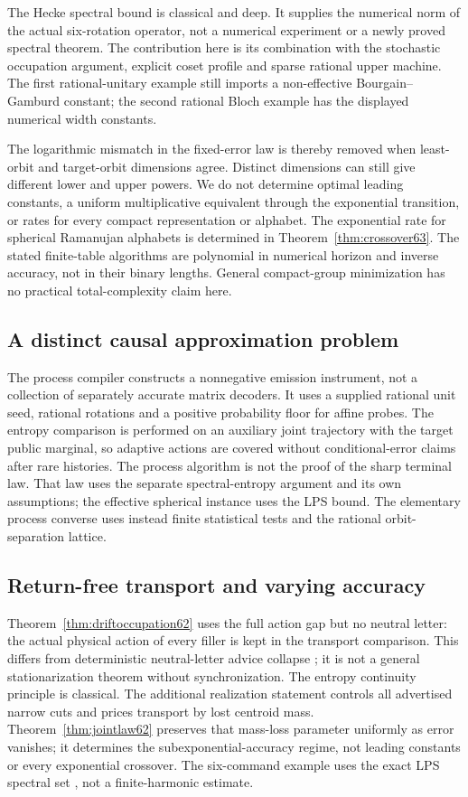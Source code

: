 The Hecke spectral bound \cite{LPS61,PLP61pre} is classical and deep.
It supplies the numerical norm of the actual six-rotation operator,
not a numerical experiment or a newly proved spectral theorem.
The contribution here is its combination with the stochastic
occupation argument, explicit coset profile and sparse rational upper
machine. The first rational-unitary example still imports a
non-effective Bourgain--Gamburd constant; the second rational Bloch
example has the displayed numerical width constants.

The logarithmic mismatch in the fixed-error law is thereby removed
when least-orbit and target-orbit dimensions agree. Distinct dimensions
can still give different lower and upper powers. We do not determine
optimal leading constants, a uniform multiplicative equivalent through
the exponential transition, or rates for every compact representation
or alphabet. The exponential rate for spherical Ramanujan alphabets
is determined in Theorem~\ref{thm:crossover63}. The stated finite-table
algorithms are polynomial in numerical horizon and inverse accuracy,
not in their binary lengths. General compact-group minimization has no
practical total-complexity claim here.

\subsection{A distinct causal approximation problem}
The process compiler constructs a nonnegative emission instrument, not
a collection of separately accurate matrix decoders. It uses a supplied
rational unit seed, rational rotations and a positive probability floor
for affine probes. The entropy comparison is performed on an auxiliary
joint trajectory with the target public marginal, so adaptive actions
are covered without conditional-error claims after rare histories.
The process algorithm is not the proof of the sharp terminal law.
That law uses the separate spectral-entropy argument and its own
assumptions; the effective spherical instance uses the LPS bound. The elementary process converse uses instead
finite statistical tests and the rational orbit-separation lattice.

\subsection{Return-free transport and varying accuracy}
Theorem~\ref{thm:driftoccupation62} uses the full action gap but no
neutral letter: the actual physical action of every filler is kept in
the transport comparison. This differs from deterministic neutral-letter
advice collapse \cite[Theorem~10]{FP}; it is not a general
stationarization theorem without synchronization. The entropy continuity
principle \cite[Proposition~1]{PW61} is classical. The additional
realization statement controls all advertised narrow cuts and prices
transport by lost centroid mass. Theorem~\ref{thm:jointlaw62} preserves
that mass-loss parameter uniformly as error vanishes; it determines the
subexponential-accuracy regime, not leading constants or every
exponential crossover. The six-command example uses the exact LPS
spectral set \cite[Theorem~1.1]{PLP61pre}, not a finite-harmonic estimate.

